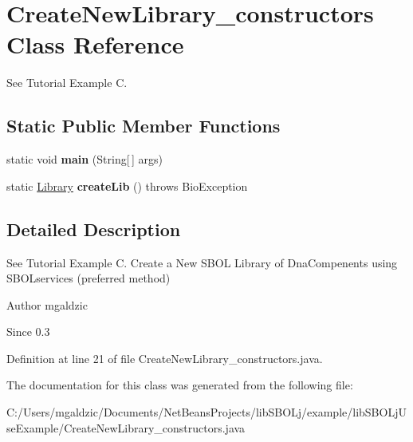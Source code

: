 \hypertarget{classlib_s_b_o_lj_use_example_1_1_create_new_library__constructors}{
\section{CreateNewLibrary\_\-constructors Class Reference}
\label{classlib_s_b_o_lj_use_example_1_1_create_new_library__constructors}
}


See Tutorial Example C.  


\subsection*{Static Public Member Functions}
\begin{DoxyCompactItemize}
\item 
\hypertarget{classlib_s_b_o_lj_use_example_1_1_create_new_library__constructors_a8b260eecbaabcef8473fd87ada040682}{
static void {\bfseries main} (String\mbox{[}$\,$\mbox{]} args)}
\label{classlib_s_b_o_lj_use_example_1_1_create_new_library__constructors_a8b260eecbaabcef8473fd87ada040682}

\item 
\hypertarget{classlib_s_b_o_lj_use_example_1_1_create_new_library__constructors_a741f4a5b3c58900b684c7e424a72be76}{
static \hyperlink{classorg_1_1sbolstandard_1_1lib_s_b_o_lj_1_1_library}{Library} {\bfseries createLib} ()  throws BioException }
\label{classlib_s_b_o_lj_use_example_1_1_create_new_library__constructors_a741f4a5b3c58900b684c7e424a72be76}

\end{DoxyCompactItemize}


\subsection{Detailed Description}
See Tutorial Example C. Create a New SBOL Library of DnaCompenents using SBOLservices (preferred method) \begin{DoxyAuthor}{Author}
mgaldzic 
\end{DoxyAuthor}
\begin{DoxySince}{Since}
0.3 
\end{DoxySince}


Definition at line 21 of file CreateNewLibrary\_\-constructors.java.



The documentation for this class was generated from the following file:\begin{DoxyCompactItemize}
\item 
C:/Users/mgaldzic/Documents/NetBeansProjects/libSBOLj/example/libSBOLjUseExample/CreateNewLibrary\_\-constructors.java\end{DoxyCompactItemize}
